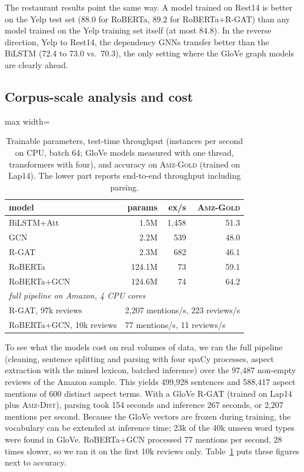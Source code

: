 \documentclass[11pt]{article}
\newcommand{\gold}{\textsc{Amz-Gold}}
\newcommand{\dist}{\textsc{Amz-Dist}}
\begin{document}
The restaurant results point the same way. A model trained on Rest14 is better on the Yelp test set (88.0 for RoBERTa, 89.2 for RoBERTa+R-GAT) than any model trained on the Yelp training set itself (at most 84.8). In the reverse direction, Yelp to Rest14, the dependency GNNs transfer better than the BiLSTM (72.4 to 73.0 vs.\ 70.3), the only setting where the GloVe graph models are clearly ahead.

\subsection{Corpus-scale analysis and cost}
\label{sec:scale}

\begin{table}[t]
\centering
\small
\setlength{\tabcolsep}{4pt}
\begin{adjustbox}{max width=\columnwidth}
\begin{tabular}{lrrr}
\toprule
model & params & ex/s & \gold \\
\midrule
BiLSTM+Att & 1.5M & 1,458 & 51.3 \\
GCN & 2.2M & 539 & 48.0 \\
R-GAT & 2.3M & 682 & 46.1 \\
RoBERTa & 124.1M & 73 & 59.1 \\
RoBERTa+GCN & 124.6M & 74 & 64.2 \\
\midrule
\multicolumn{4}{l}{\textit{full pipeline on Amazon, 4 CPU cores}} \\
R-GAT, 97k reviews & \multicolumn{3}{l}{2,207 mentions/s, 223 reviews/s} \\
RoBERTa+GCN, 10k reviews & \multicolumn{3}{l}{77 mentions/s, 11 reviews/s} \\
\bottomrule
\end{tabular}
\end{adjustbox}
\caption{Trainable parameters, test-time throughput (instances per second on CPU, batch 64; GloVe models measured with one thread, transformers with four), and accuracy on \gold{} (trained on Lap14). The lower part reports end-to-end throughput including parsing.}
\label{tab:cost}
\end{table}

To see what the models cost on real volumes of data, we ran the full pipeline (cleaning, sentence splitting and parsing with four spaCy processes, aspect extraction with the mined lexicon, batched inference) over the 97,487 non-empty reviews of the Amazon sample. This yields 499,928 sentences and 588,417 aspect mentions of 600 distinct aspect terms. With a GloVe R-GAT (trained on Lap14 plus \dist), parsing took 154 seconds and inference 267 seconds, or 2,207 mentions per second. Because the GloVe vectors are frozen during training, the vocabulary can be extended at inference time; 23k of the 40k unseen word types were found in GloVe. RoBERTa+GCN processed 77 mentions per second, 28 times slower, so we ran it on the first 10k reviews only. Table~\ref{tab:cost} puts these figures next to accuracy.
\end{document}
